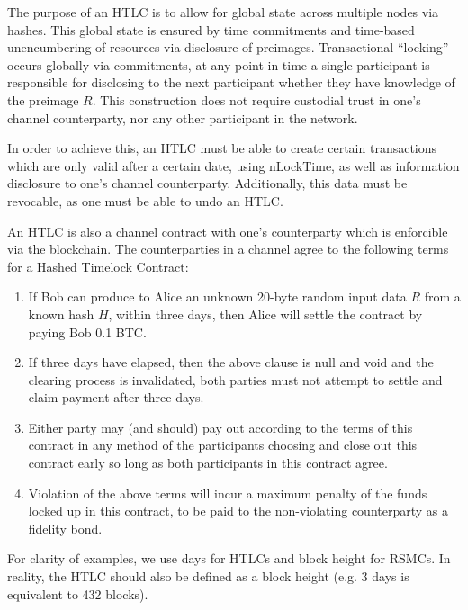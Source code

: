 \documentclass[letterpaper,11pt]{article}
\begin{document}
The purpose of an HTLC is to allow for global state across multiple nodes via
hashes. This global state is ensured by time commitments and time-based
unencumbering of resources via disclosure of preimages. Transactional
``locking'' occurs globally via commitments, at any point in time a single
participant is responsible for disclosing to the next participant whether they
have knowledge of the preimage $R$. This construction does not require custodial
trust in one's channel counterparty, nor any other participant in the network.

In order to achieve this, an HTLC must be able to create certain transactions
which are only valid after a certain date, using nLockTime, as well as
information disclosure to one's channel counterparty. Additionally, this data
must be revocable, as one must be able to undo an HTLC.

An HTLC is also a channel contract with one's counterparty which is enforcible
via the blockchain. The counterparties in a channel agree to the following
terms for a Hashed Timelock Contract:

\begin{enumerate}
	\item If Bob can produce to Alice an unknown 20-byte random input data
		$R$ from a known hash $H$, within three days, then Alice will
		settle the contract by paying Bob 0.1 BTC.

	\item If three days have elapsed, then the above clause is null and void
		and the clearing process is invalidated, both parties must not
		attempt to settle and claim payment after three days.

	\item Either party may (and should) pay out according to the terms of
		this contract in any method of the participants choosing and
		close out this contract early so long as both participants in
		this contract agree.

	\item Violation of the above terms will incur a maximum penalty of the
		funds locked up in this contract, to be paid to the
		non-violating counterparty as a fidelity bond.

\end{enumerate}

For clarity of examples, we use days for HTLCs and block height for RSMCs. In
reality, the HTLC should also be defined as a block height (e.g. 3 days is
equivalent to 432 blocks).
\end{document}
